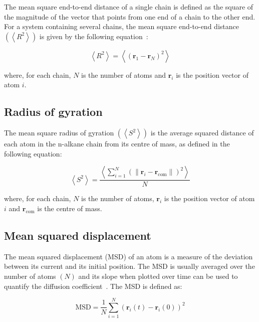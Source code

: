 \documentclass[5p]{elsarticle}
\begin{document}
The mean square end-to-end distance of a single chain is defined as the square  of the magnitude of the vector that points from one end of a chain to the other end. For a system containing several chains, the mean square end-to-end distance $\left(\left< R^2 \right>\right)$ is given by the following equation~\cite{Brown1994}:

\begin{equation}
	\left< R^2 \right> = \left<\left( \mathbf{r}_1 - \mathbf{r}_N \right)^2\right>
	\label{eq:e2e2}
\end{equation}

where, for each chain,  $N$ is the number of atoms and  $ \mathbf{r}_i$ is the position vector of atom $i$. 


\subsection{Radius of gyration}

The mean square radius of gyration $\left(\left< S^2 \right>\right)$  is the average squared distance of each atom in the n-alkane chain  from its centre of mass, as defined in the following equation\cite{Brown1994}:

\begin{equation}
	\left< S^2 \right> = \frac{\left< \sum_{i=1}^{N}  \left ( \lVert \mathbf{r}_i - \mathbf{r}_{\text{com}} \rVert \right)^2 \right>}{N}
\end{equation}

where, for each chain,  $N$ is the number of atoms, $ \mathbf{r}_i$ is the position vector of atom $i$  and $\mathbf{r}_{\text{com}}$ is the centre of mass. 


\subsection{Mean squared displacement}

The mean squared displacement (MSD) of an atom  is a measure of the deviation between its current and its initial position. The MSD is usually averaged over the number of atoms  $\left(N\right)$ and its slope when plotted over time can be used to quantify the diffusion coefficient~\cite{Auhl2003}. The MSD is defined as:

\begin{equation}
	\text{MSD} = \frac{1}{N}\sum_{i=1}^{N} \left( \mathbf{r}_i\left(t\right)-\mathbf{r}_i\left(0\right)\right)^2
\end{equation}
\end{document}

